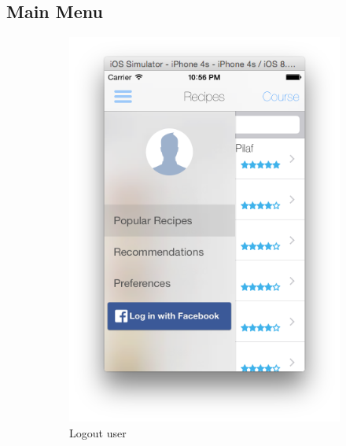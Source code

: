 \subsection{Main Menu}
\begin{figure}[h]
	\begin{subfigure}{.49\textwidth}
		\includegraphics[width=.9\linewidth]{figures/ch4_app_screen_shots/main_menu/main_menu_1.png}
		\caption{Logout user}
	\end{subfigure}
	\begin{subfigure}{.49\textwidth}

\end{subfigure}
\end{figure}
